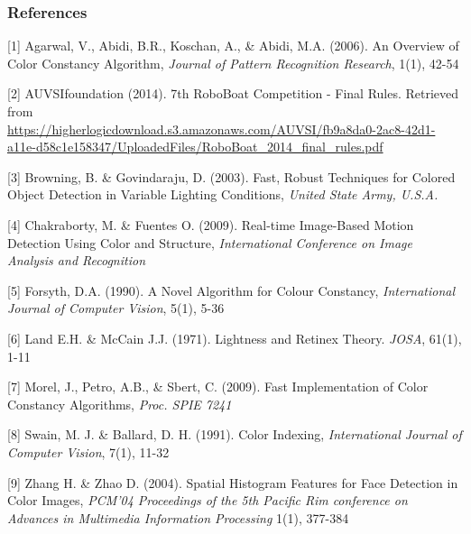 \documentclass{article} %
\begin{document}
\subsubsection*{References}



\small{

[1]  Agarwal, V., Abidi, B.R., Koschan, A., \& Abidi, M.A. (2006). An Overview of Color Constancy Algorithm, {\it Journal of Pattern Recognition Research}, 1(1), 42-54

[2] AUVSIfoundation (2014). 7th RoboBoat Competition - Final Rules. Retrieved from\\
\href{url}{https://higherlogicdownload.s3.amazonaws.com/AUVSI/fb9a8da0-2ac8-42d1-a11e-d58c1e158347/UploadedFiles/RoboBoat_2014_final_rules.pdf}

[3] Browning, B. \& Govindaraju, D. (2003). Fast, Robust Techniques for Colored Object Detection in Variable Lighting Conditions, {\it United State Army, U.S.A.}

[4] Chakraborty, M. \& Fuentes O. (2009). Real-time Image-Based Motion Detection Using Color and Structure, {\it International Conference on Image Analysis and Recognition}

[5] Forsyth, D.A. (1990). A Novel Algorithm for Colour Constancy, {\it International Journal of Computer Vision}, 5(1), 5-36

[6] Land E.H. \& McCain J.J. (1971). Lightness and Retinex Theory. {\it JOSA}, 61(1), 1-11

[7] Morel, J., Petro, A.B., \& Sbert, C. (2009). Fast Implementation of Color Constancy Algorithms, {\it Proc. SPIE 7241}

[8] Swain, M. J. \& Ballard, D. H. (1991). Color Indexing, {\it International Journal of Computer Vision}, 7(1), 11-32

[9] Zhang H. \& Zhao D. (2004). Spatial Histogram Features for Face Detection in Color Images, {\it PCM'04 Proceedings of the 5th Pacific Rim conference on Advances in Multimedia Information Processing} 1(1), 377-384 



}
\end{document}
